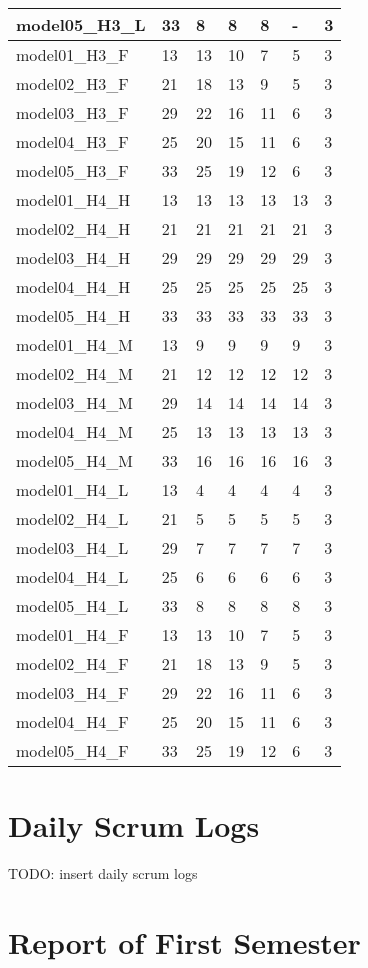 \begin{longtable}{|l|l|l|l|l|l|l|}
model05\_H3\_L & 33 & 8 & 8 & 8 & - & 3 \\ \hline
model01\_H3\_F & 13 & 13 & 10 & 7 & 5 & 3 \\ \hline
model02\_H3\_F & 21 & 18 & 13 & 9 & 5 & 3 \\ \hline
model03\_H3\_F & 29 & 22 & 16 & 11 & 6 & 3 \\ \hline
model04\_H3\_F & 25 & 20 & 15 & 11 & 6 & 3 \\ \hline
model05\_H3\_F & 33 & 25 & 19 & 12 & 6 & 3 \\ \hline
model01\_H4\_H & 13 & 13 & 13 & 13 & 13 & 3 \\ \hline
model02\_H4\_H & 21 & 21 & 21 & 21 & 21 & 3 \\ \hline
model03\_H4\_H & 29 & 29 & 29 & 29 & 29 & 3 \\ \hline
model04\_H4\_H & 25 & 25 & 25 & 25 & 25 & 3 \\ \hline
model05\_H4\_H & 33 & 33 & 33 & 33 & 33 & 3 \\ \hline
model01\_H4\_M & 13 & 9 & 9 & 9 & 9 & 3 \\ \hline
model02\_H4\_M & 21 & 12 & 12 & 12 & 12 & 3 \\ \hline
model03\_H4\_M & 29 & 14 & 14 & 14 & 14 & 3 \\ \hline
model04\_H4\_M & 25 & 13 & 13 & 13 & 13 & 3 \\ \hline
model05\_H4\_M & 33 & 16 & 16 & 16 & 16 & 3 \\ \hline
model01\_H4\_L & 13 & 4 & 4 & 4 & 4 & 3 \\ \hline
model02\_H4\_L & 21 & 5 & 5 & 5 & 5 & 3 \\ \hline
model03\_H4\_L & 29 & 7 & 7 & 7 & 7 & 3 \\ \hline
model04\_H4\_L & 25 & 6 & 6 & 6 & 6 & 3 \\ \hline
model05\_H4\_L & 33 & 8 & 8 & 8 & 8 & 3 \\ \hline
model01\_H4\_F & 13 & 13 & 10 & 7 & 5 & 3 \\ \hline
model02\_H4\_F & 21 & 18 & 13 & 9 & 5 & 3 \\ \hline
model03\_H4\_F & 29 & 22 & 16 & 11 & 6 & 3 \\ \hline
model04\_H4\_F & 25 & 20 & 15 & 11 & 6 & 3 \\ \hline
model05\_H4\_F & 33 & 25 & 19 & 12 & 6 & 3 \\ \hline
\end{longtable}

\newpage
\section{Daily Scrum Logs}
\label{section:appendix_b}
TODO: insert daily scrum logs

\newpage
\section{ Report of First Semester}
\label{section:appendix_c}
\newpage

